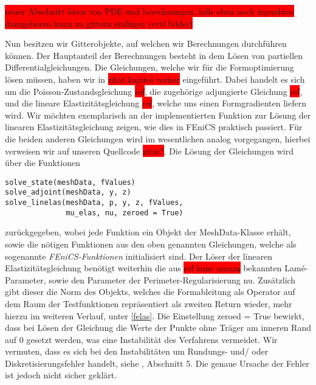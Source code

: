 \documentclass[bibliography=totoc,12pt,a4paper]{scrartcl}
\theoremstyle{exampstyle}
\numberwithin{equation}{section}
\begin{document}
\colorbox{red}{neuer Abschnitt lösen von PDE und berechnungen, falls oben noch irgendwas dazugehören kann zu gittern einfügen (evtl bilder)}

Nun besitzen wir Gitterobjekte, auf welchen wir Berechnungen durchführen können. Der Hauptanteil der Berechnungen besteht in dem Lösen von partiellen Differentialgleichungen. Die Gleichungen, welche wir für die Formoptimierung lösen müssen, haben wir in \colorbox{red}{zitat kapitel vorher} eingeführt. Dabei handelt es sich um die Poisson-Zustandsgleichung \colorbox{red}{ref}, die zugehörige adjungierte Gleichung \colorbox{red}{ref}, und die lineare Elastizitätsgleichung \colorbox{red}{ref}, welche uns einen Formgradienten liefern wird. Wir möchten exemplarisch an der implementierten Funktion zur Lösung der linearen Elastizitätsgleichung zeigen, wie dies in FEniCS praktisch passiert. Für die beiden anderen Gleichungen wird im wesentlichen analog vorgegangen, hierbei verweisen wir auf unseren Quellcode \colorbox{red}{zitat?}. Die Lösung der Gleichungen wird über die Funktionen 
\begin{lstlisting}
solve_state(meshData, fValues)
solve_adjoint(meshData, y, z)
solve_linelas(meshData, p, y, z, fValues, 
	          mu_elas, nu, zeroed = True)
\end{lstlisting}
zurückgegeben, wobei jede Funktion ein Objekt der \textsf{MeshData}-Klasse erhält, sowie die nötigen Funktionen aus den oben genannten Gleichungen, welche als sogenannte \textit{FEniCS-Funktionen} initialisiert sind. Der Löser der linearen Elastizitätsgleichung benötigt weiterhin die aus \colorbox{red}{ref lame param} bekannten Lamé-Parameter, sowie den Parameter der Perimeter-Regularisierung \textsf{nu}. Zusätzlich gibt dieser die Norm des Objekts, welches die Formableitung als Operator auf dem Raum der Testfunktionen repräsentiert als zweiten Return wieder, mehr hierzu im weiteren Verlauf, unter \ref{felas}. Die Einstellung \textsf{zeroed = True} bewirkt, dass bei Lösen der Gleichung die Werte der Punkte ohne Träger am inneren Rand auf 0 gesetzt werden, was eine Instabilität des Verfahrens vermeidet. Wir vermuten, dass es sich bei den Instabilitäten um Rundungs- und/ oder Diskretisierungsfehler handelt, siehe \cite{bfgs1}, Abschnitt 5. Die genaue Ursache der Fehler ist jedoch nicht sicher geklärt. 
\end{document}
